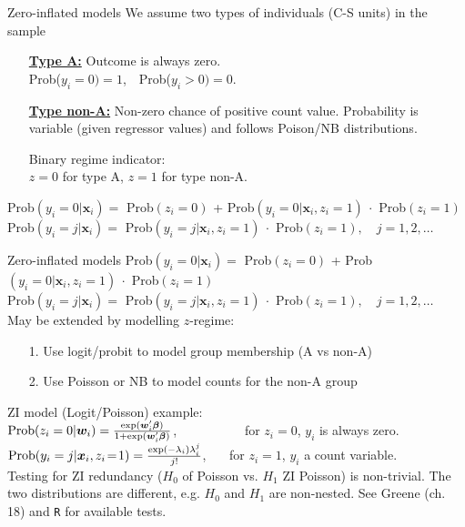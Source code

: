 \documentclass[usenames,dvipsnames]{beamer}
\begin{document}
\begin{frame}{Zero-inflated models}
We assume two types of individuals (C-S units) in the sample\\
\begin{itemize}
\item[] \underline{\textbf{Type A:}} Outcome is always zero.\\
Prob($y_i=0) =1$,~~Prob($y_i>0) =0$.\\
\smallskip
\item[] \underline{\textbf{Type non-A:}} Non-zero chance of positive count value. Probability is variable (given regressor values) and follows Poison/NB distributions.
\smallskip
\item[] Binary regime indicator: \\
$z=0$ for type A, $z=1$ for type non-A.
\end{itemize}
\medskip
\small{Prob$(y_i=0|\bm{x}_i) = $ Prob$(z_i\!=\!0)$ +  Prob$(y_i=0|\bm{x}_i, z_i\!=\!1)~\cdot$ Prob$(z_i\!=\!1)$}\\
\small{Prob$(y_i=j|\bm{x}_i) =$ Prob$(y_i=j|\bm{x}_i, z_i\!=\!1)~\cdot$ Prob$(z_i\!=\!1),\quad j=1,2,\dots$}
\end{frame}
\begin{frame}{Zero-inflated models}
\small{Prob$(y_i=0|\bm{x}_i) = $ Prob$(z_i\!=\!0)$ +  Prob$(y_i=0|\bm{x}_i, z_i\!=\!1)~\cdot$ Prob$(z_i\!=\!1)$}\\
\small{Prob$(y_i=j|\bm{x}_i) =$ Prob$(y_i=j|\bm{x}_i, z_i\!=\!1)~\cdot$ Prob$(z_i\!=\!1),\quad j=1,2,\dots$}\\
\medskip
May be extended by modelling $z$-regime:
\begin{itemize}
\item[1.] Use logit/probit to model group membership (A vs non-A)
\item[2.] Use Poisson or NB to model counts for the  non-A group\\
\end{itemize}
\medskip
ZI model (Logit/Poisson) example:\\
\medskip
$\textnormal{Prob}(z_i=0|\bm{w}_i) = \frac{\exp(\bm{w}_i^{\prime}\bm{\beta})}{1+\exp(\bm{w}_i^{\prime}\bm{\beta})}$, ~~~~~~~~~~for $z_i = 0$, $y_i$ is always zero.\\
\medskip
$\textnormal{Prob}(y_i=j|\bm{x}_i,z_i\!=\!1) = \frac{\exp(-\lambda_i)\lambda_i^j}{j!}$, ~~~for $z_i = 1$, $y_i$ a count variable.\\
\bigskip
Testing for ZI redundancy ($H_0$ of Poisson vs. $H_1$ ZI Poisson) is non-trivial. The two distributions are different, e.g. $H_0$ and $H_1$ are non-nested. See Greene (ch. 18) and \texttt{R} for available tests.
\end{frame}
\end{document}
